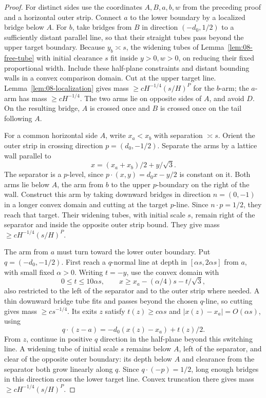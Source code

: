 \begin{proof}
For distinct sides use the coordinates \(A,B,a,b,w\) from the preceding
proof and a horizontal outer strip. Connect \(a\) to the lower boundary
by a localized bridge below \(A\). For \(b\), take bridges from \(B\)
in direction \((-d_0,1/2)\) to a sufficiently distant parallel line,
so that their straight tubes pass beyond the upper target boundary.
Because \(y_b\asymp s\), the widening tubes of
Lemma~\ref{lem:08-free-tube} with initial clearance \(s\) fit inside
\(y>0,w>0\), on reducing their fixed proportional width. Include these
half-plane constraints and distant bounding walls in a convex comparison
domain. Cut at the upper target line. Lemma~\ref{lem:08-localization}
gives mass \(\ge cH^{-1/4}(s/H)^P\) for the \(b\)-arm; the
\(a\)-arm has mass \(\ge cH^{-1/4}\). The two arms lie on opposite
sides of \(A\), and avoid \(D\). On the resulting bridge, \(A\) is
crossed once and \(B\) is crossed once on the tail following \(A\).

For a common horizontal side \(A\), write \(x_a<x_b\) with separation
\(\asymp s\). Orient the outer strip in crossing direction
\(p=(d_0,-1/2)\). Separate the arms by a lattice wall parallel to
\[
 x=(x_a+x_b)/2+y/\sqrt3.
\]
The separator is a $p$-level, since $p\cdot(x,y)=d_0x-y/2$ is
constant on it. Both arms lie below \(A\), the arm from \(b\) to the upper \(p\)-boundary
on the right of the wall. Construct this arm by taking downward bridges
in direction \(n=(0,-1)\) in a longer convex domain and cutting at the
target \(p\)-line. Since \(n\cdot p=1/2\), they reach that target.
Their widening tubes, with initial scale \(s\), remain right of the
separator and inside the opposite outer strip bound. They give mass
\(\ge cH^{-1/4}(s/H)^P\).

The arm from \(a\) must turn toward the lower outer boundary. Put
\(q=(-d_0,-1/2)\). First reach a \(q\)-normal line at depth in
\([\alpha s,2\alpha s]\) from \(a\), with small fixed \(\alpha>0\).
Writing \(t=-y\), use the convex domain with
\[
 0\le t\le10\alpha s,
 \qquad x\ge x_a-(\alpha/4)s-t/\sqrt3,
\]
also restricted to the left of the separator and to the outer strip where
needed. A thin downward bridge tube fits and passes beyond the chosen
\(q\)-line, so cutting gives mass \(\ge cs^{-1/4}\). Its exits \(z\)
satisfy \(t(z)\ge c\alpha s\) and
\(|x(z)-x_a|=O(\alpha s)\), using
\[
 q\cdot(z-a)=-d_0(x(z)-x_a)+t(z)/2.
\]
From \(z\), continue in positive \(q\) direction in the half-plane beyond
this switching line. A widening tube of initial scale \(s\) remains
below \(A\), left of the separator, and clear of the opposite outer
boundary: its depth below \(A\) and clearance from the separator both
grow linearly along \(q\). Since \(q\cdot(-p)=1/2\), long enough
bridges in this direction cross the lower target line. Convex truncation
there gives mass \(\ge cH^{-1/4}(s/H)^P\).


\end{proof}
